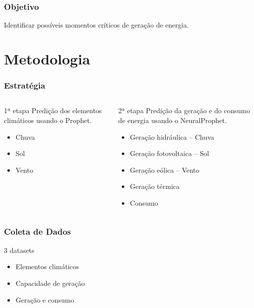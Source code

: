 \documentclass{beamer}
\begin{document}
\begin{frame}
\frametitle{Objetivo}
Identificar possíveis momentos críticos de geração de energia.
\end{frame}


\section{Metodologia}


\begin{frame}
\frametitle{Estratégia}

\begin{columns}
    
    \begin{block}{1ª etapa}
    Predição dos elementos climáticos usando o Prophet.
    \vspace{5.4mm}
    \begin{itemize}
        \item Chuva
        \vspace{5.4mm}
        \item Sol
        \vspace{5.4mm}
        \item Vento
    \end{itemize}
    \end{block}

    
    \begin{block}{2ª etapa}
    Predição da geração e do consumo de energia usando o NeuralProphet.
    \begin{itemize}
        \item Geração hidráulica -- Chuva
        \item Geração fotovoltaica -- Sol
        \item Geração eólica -- Vento
        \item Geração térmica
        \item Consumo
    \end{itemize}
    \end{block}
\end{columns}

\end{frame}


\begin{frame}
\frametitle{Coleta de Dados}
3 datasets
\begin{itemize}
    \item Elementos climáticos
    \item Capacidade de geração
    \item Geração e consumo
\end{itemize}
\end{frame}
\end{document}
